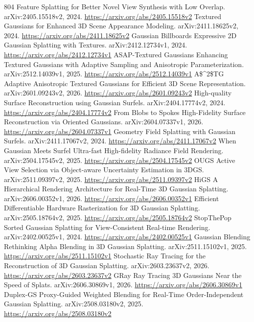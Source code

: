 \documentclass[11pt]{article}
\begin{document}
\begin{thebibliography}{804}
 Feature Splatting for Better Novel View Synthesis with Low Overlap. arXiv:2405.15518v2, 2024. \url{https://arxiv.org/abs/2405.15518v2}
 Textured Gaussians for Enhanced 3D Scene Appearance Modeling. arXiv:2411.18625v2, 2024. \url{https://arxiv.org/abs/2411.18625v2}
 Gaussian Billboards Expressive 2D Gaussian Splatting with Textures. arXiv:2412.12734v1, 2024. \url{https://arxiv.org/abs/2412.12734v1}
 ASAP-Textured Gaussians Enhancing Textured Gaussians with Adaptive Sampling and Anisotropic Parameterization. arXiv:2512.14039v1, 2025. \url{https://arxiv.org/abs/2512.14039v1}
 A\$\textasciicircum{}2\$TG Adaptive Anisotropic Textured Gaussians for Efficient 3D Scene Representation. arXiv:2601.09243v2, 2026. \url{https://arxiv.org/abs/2601.09243v2}
 High-quality Surface Reconstruction using Gaussian Surfels. arXiv:2404.17774v2, 2024. \url{https://arxiv.org/abs/2404.17774v2}
 From Blobs to Spokes High-Fidelity Surface Reconstruction via Oriented Gaussians. arXiv:2604.07337v1, 2026. \url{https://arxiv.org/abs/2604.07337v1}
 Geometry Field Splatting with Gaussian Surfels. arXiv:2411.17067v2, 2024. \url{https://arxiv.org/abs/2411.17067v2}
 When Gaussian Meets Surfel Ultra-fast High-fidelity Radiance Field Rendering. arXiv:2504.17545v2, 2025. \url{https://arxiv.org/abs/2504.17545v2}
 OUGS Active View Selection via Object-aware Uncertainty Estimation in 3DGS. arXiv:2511.09397v2, 2025. \url{https://arxiv.org/abs/2511.09397v2}
 HiGS A Hierarchical Rendering Architecture for Real-Time 3D Gaussian Splatting. arXiv:2606.00352v1, 2026. \url{https://arxiv.org/abs/2606.00352v1}
 Efficient Differentiable Hardware Rasterization for 3D Gaussian Splatting. arXiv:2505.18764v2, 2025. \url{https://arxiv.org/abs/2505.18764v2}
 StopThePop Sorted Gaussian Splatting for View-Consistent Real-time Rendering. arXiv:2402.00525v1, 2024. \url{https://arxiv.org/abs/2402.00525v1}
 Gaussian Blending Rethinking Alpha Blending in 3D Gaussian Splatting. arXiv:2511.15102v1, 2025. \url{https://arxiv.org/abs/2511.15102v1}
 Stochastic Ray Tracing for the Reconstruction of 3D Gaussian Splatting. arXiv:2603.23637v2, 2026. \url{https://arxiv.org/abs/2603.23637v2}
 GRay Ray Tracing 3D Gaussians Near the Speed of Splats. arXiv:2606.30869v1, 2026. \url{https://arxiv.org/abs/2606.30869v1}
 Duplex-GS Proxy-Guided Weighted Blending for Real-Time Order-Independent Gaussian Splatting. arXiv:2508.03180v2, 2025. \url{https://arxiv.org/abs/2508.03180v2}

\end{thebibliography}
\end{document}
